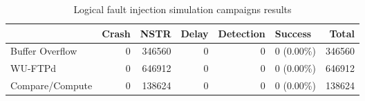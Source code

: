 \begin{table}[H]
\centering
\caption{Logical fault injection simulation campaigns results}
\label{table:end_sim_by_status_hamming_single_bitflip_temporel}
\begin{tabular}{lrrrrlr}
\toprule
 & Crash & NSTR & Delay & Detection & Success & Total \\
\midrule
Buffer Overflow & 0 & 346560 & 0 & 0 & 0 (0.00\%) & 346560 \\
WU-FTPd & 0 & 646912 & 0 & 0 & 0 (0.00\%) & 646912 \\
Compare/Compute & 0 & 138624 & 0 & 0 & 0 (0.00\%) & 138624 \\
\bottomrule
\end{tabular}
\end{table}
